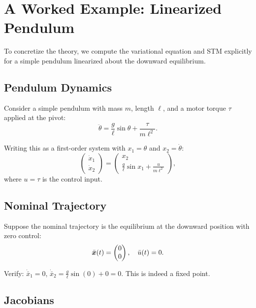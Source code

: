 \section{A Worked Example: Linearized Pendulum}

To concretize the theory, we compute the variational equation and STM explicitly for a simple pendulum
linearized about the downward equilibrium.

\subsection{Pendulum Dynamics}

Consider a simple pendulum with mass $m$, length $\ell$, and a motor torque $\tau$ applied at the pivot:
\begin{equation}
\ddot\theta = \frac{g}{\ell}\sin\theta + \frac{\tau}{m\ell^2}.
\label{eq:ch2:pend-ode}
\end{equation}

Writing this as a first-order system with $x_1 = \theta$ and $x_2 = \dot\theta$:
\begin{equation}
\begin{pmatrix}\dot x_1\\\dot x_2\end{pmatrix} = \begin{pmatrix}x_2\\\frac{g}{\ell}\sin x_1 + \frac{u}{m\ell^2}\end{pmatrix},
\label{eq:ch2:pend-first}
\end{equation}
where $u = \tau$ is the control input.

\subsection{Nominal Trajectory}

Suppose the nominal trajectory is the equilibrium at the downward position with zero control:
\begin{equation}
\bar{\bm{x}}(t) = \begin{pmatrix}0\\0\end{pmatrix}, \quad \bar u(t) = 0.
\label{eq:ch2:pend-nominal}
\end{equation}

Verify: $\dot{\bar x}_1 = 0$, $\dot{\bar x}_2 = \frac{g}{\ell}\sin(0) + 0 = 0$. This is indeed a fixed point.

\subsection{Jacobians}

